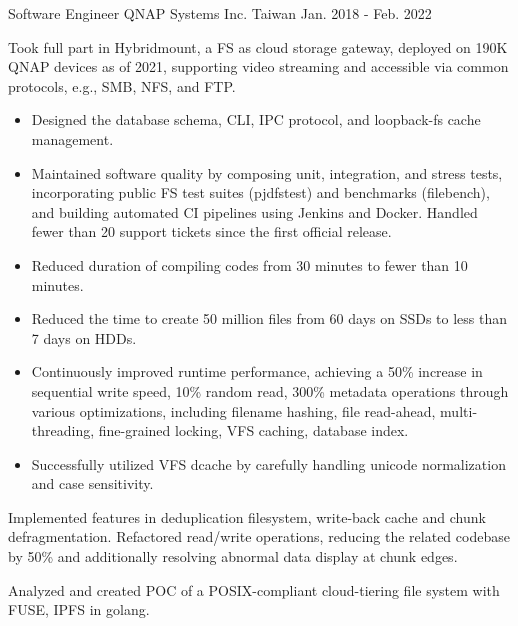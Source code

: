 \begin{cventries}
  \cventry
    {Software Engineer} %
    {QNAP Systems Inc.} %
    {Taiwan} %
    {Jan. 2018 - Feb. 2022} %
    {
      \begin{cvitems} %
        \item {Took full part in Hybridmount, a FS as cloud storage
          gateway, deployed on 190K QNAP devices as of 2021, supporting video
          streaming and accessible via common protocols, e.g., SMB, NFS, and FTP.}
        \begin{itemize}
          \item {Designed the database schema, CLI, IPC protocol, and loopback-fs cache
            management.}
          \item {Maintained software quality by composing unit, integration, and
              stress tests, incorporating public FS test suites (pjdfstest) and
            benchmarks (filebench), and building automated CI pipelines using
            Jenkins and Docker. Handled fewer than 20 support tickets since the
            first official release.}
          \item {Reduced duration of compiling codes from 30 minutes to fewer
            than 10 minutes.}
          \item {Reduced the time to create 50 million files from 60 days
            on SSDs to less than 7 days on HDDs.}
          \item {Continuously improved runtime performance, achieving a 50\%
            increase in sequential write speed, 10\% random read, 300\% metadata
            operations through various optimizations, including filename
            hashing, file read-ahead, multi-threading, fine-grained locking, VFS
            caching, database index.}
          \item {Successfully utilized VFS dcache by carefully handling unicode
            normalization and case sensitivity.}
        \end{itemize}
        \item {Implemented features in deduplication filesystem, write-back
            cache and chunk defragmentation. Refactored read/write operations,
            reducing the related codebase by 50\% and additionally resolving
          abnormal data display at chunk edges.}
        \item {Analyzed and created POC of a POSIX-compliant cloud-tiering file
          system with FUSE, IPFS in golang.}
      \end{cvitems}
    }

\end{cventries}
